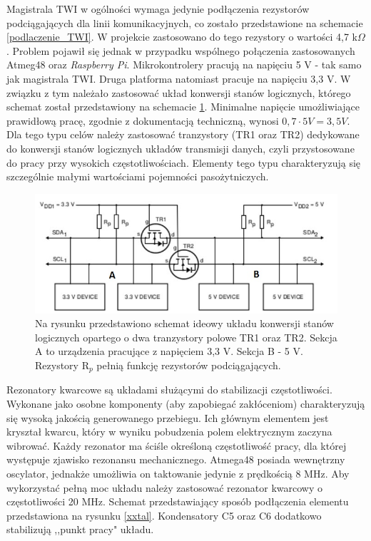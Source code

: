   Magistrala TWI w ogólności wymaga jedynie podłączenia rezystorów podciągających dla linii komunikacyjnych, co zostało przedstawione na schemacie \ref{podlaczenie_TWI}. W projekcie zastosowano do tego rezystory o wartości 4,7 k$\Omega$. Problem pojawił się jednak w przypadku wspólnego połączenia zastosowanych Atmeg48 oraz \textit{Raspberry Pi}. Mikrokontrolery pracują na napięciu 5 V - tak samo jak magistrala TWI. Druga platforma natomiast pracuje na napięciu 3,3 V. W związku z tym należało zastosować układ konwersji stanów logicznych, którego schemat został przedstawiony na schemacie \ref{konw_sch}. Minimalne napięcie umożliwiające prawidłową pracę, zgodnie z dokumentacją techniczną, wynosi $0,7\cdot 5V = 3,5 V$. Dla tego typu celów należy zastosować tranzystory (TR1 oraz TR2) dedykowane do konwersji stanów logicznych układów transmisji danych, czyli przystosowane do pracy przy wysokich częstotliwościach. Elementy tego typu charakteryzują się szczególnie małymi wartościami pojemności pasożytniczych.
  
\begin{figure}[H]
    \begin{center}
      \includegraphics[scale=0.40]{imgs/konwersja.jpg}
 	\caption[Konwersja stanów logicznych.]{\small{Na rysunku przedstawiono schemat ideowy układu konwersji stanów logicznych opartego o dwa tranzystory polowe TR1 oraz TR2. Sekcja A to urządzenia pracujące z napięciem 3,3 V. Sekcja B - 5 V. Rezystory R$_p$ pełnią funkcję rezystorów podciągających.}\footnotemark}
	\label{konw_sch}
    \end{center}
  \end{figure}  
  	  
  Rezonatory kwarcowe są układami służącymi do stabilizacji częstotliwości. Wykonane jako osobne komponenty (aby zapobiegać zakłóceniom) charakteryzują się wysoką jakością generowanego przebiegu. Ich głównym elementem jest kryształ kwarcu, który w wyniku pobudzenia polem elektrycznym zaczyna wibrować. Każdy rezonator ma ściśle określoną częstotliwość pracy, dla której występuje zjawisko rezonansu mechanicznego.  Atmega48 posiada wewnętrzny oscylator, jednakże umożliwia on taktowanie jedynie z prędkością 8 MHz. Aby wykorzystać pełną moc układu należy zastosować rezonator kwarcowy o częstotliwości 20 MHz. Schemat przedstawiający sposób podłączenia elementu przedstawiona na rysunku \ref{xxtal}. Kondensatory C5 oraz C6 dodatkowo stabilizują ,,punkt pracy" układu. 
  
